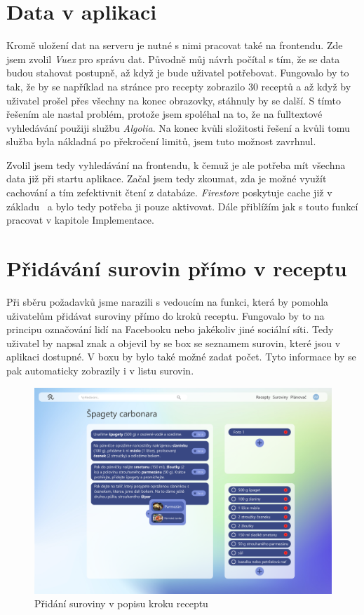 \section{Data v aplikaci}
Kromě uložení dat na serveru je nutné s nimi pracovat také na frontendu. Zde jsem zvolil \emph{Vuex} pro správu dat. Původně
můj návrh počítal s tím, že se data budou stahovat postupně, až když je bude uživatel potřebovat. Fungovalo by to tak, že by
se například na stránce pro recepty zobrazilo 30 receptů a až když by uživatel prošel přes všechny na konec obrazovky, stáhnuly
by se další. S tímto řešením ale nastal problém, protože jsem spoléhal na to, že na fulltextové vyhledávání použiji službu
\emph{Algolia}. Na konec kvůli složitosti řešení a kvůli tomu služba byla nákladná po překročení limitů, jsem tuto možnost zavrhnul.

Zvolil jsem tedy vyhledávání na frontendu, k čemuž je ale potřeba mít všechna data již při startu aplikace. Začal jsem tedy
zkoumat, zda je možné využít cachování a tím zefektivnit čtení z databáze. \emph{Firestore} poskytuje cache již v základu~\cite{FirestoreCache} a bylo
tedy potřeba ji pouze aktivovat. Dále přiblížím jak s touto funkcí pracovat v kapitole Implementace.

\section{Přidávání surovin přímo v receptu}
Při sběru požadavků jsme narazili s vedoucím na funkci, která by pomohla uživatelům přidávat suroviny přímo do kroků receptu.
Fungovalo by to na principu označování lidí na Facebooku nebo jakékoliv jiné sociální síti. Tedy uživatel by napsal znak 
a objevil by se box se seznamem surovin, které jsou v aplikaci dostupné. V boxu by bylo také možné zadat počet. Tyto informace
by se pak automaticky zobrazily i v listu surovin.

\begin{figure}[H]
    \includegraphics[width=\textwidth]{pdf/adobexd/suroviny-v-textu}
    \caption{Přidání suroviny v popisu kroku receptu} \label{picture:recipeo:suroviny-v-textu}
\end{figure}
